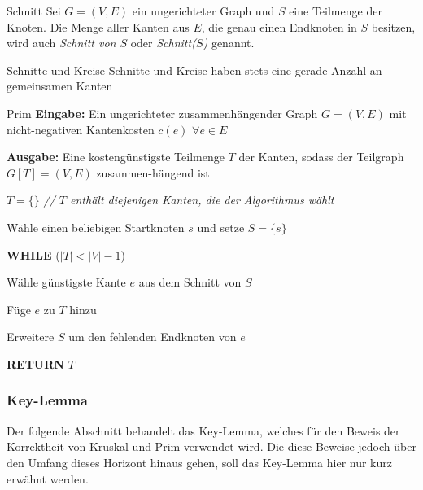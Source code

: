 \documentclass{panikzettel}
\newcommand\tab[1][1cm]{\hspace*{#1}}
\newcommand{\boxspace}{	\vspace{-\baselineskip}	}
\begin{document}
\begin{halfboxl}
	\boxspace
\begin{defi}{Schnitt}
	Sei $G=(V,E)$ ein ungerichteter Graph und $S$ eine Teilmenge der Knoten. Die Menge aller Kanten aus $E$, die genau einen Endknoten in $S$ besitzen, wird auch \emph{Schnitt von $S$} oder \emph{Schnitt($S$)} genannt.
\end{defi}

\end{halfboxl}%
\begin{halfboxr}
	\boxspace
	
	\begin{theo}{Schnitte und Kreise}
		Schnitte und Kreise haben stets eine gerade Anzahl an gemeinsamen Kanten
	\end{theo}
\end{halfboxr}


\begin{algo}{Prim}
	\textbf{Eingabe:} Ein ungerichteter zusammenhängender Graph $G = (V,E)$ mit nicht-negativen Kantenkosten $c(e)$ $\forall e \in E$
	
	\textbf{Ausgabe:} Eine kostengünstigste Teilmenge $T$ der Kanten, sodass der Teilgraph $G[T] = (V,E)$ zusammen-hängend ist
	
	\tcblower
	
	$T = \{ \}$ \textit{ \color{gray} // $T$ enthält diejenigen Kanten, die der Algorithmus wählt }
	
	Wähle einen beliebigen Startknoten $s$ und setze $S = \{s\}$
	
	\textbf{WHILE} ($|T| < |V| - 1$)
	
	\tab Wähle günstigste Kante $e$ aus dem Schnitt von $S$

	\tab Füge $e$ zu $T$ hinzu
	
	\tab Erweitere $S$ um den fehlenden Endknoten von $e$
	
	\textbf{RETURN} $T$
\end{algo}

\subsubsection{Key-Lemma}

Der folgende Abschnitt behandelt das Key-Lemma, welches für den Beweis der Korrektheit von Kruskal und Prim verwendet wird. Die diese Beweise jedoch über den Umfang dieses Horizont hinaus gehen, soll das Key-Lemma hier nur kurz erwähnt werden.
\end{document}
